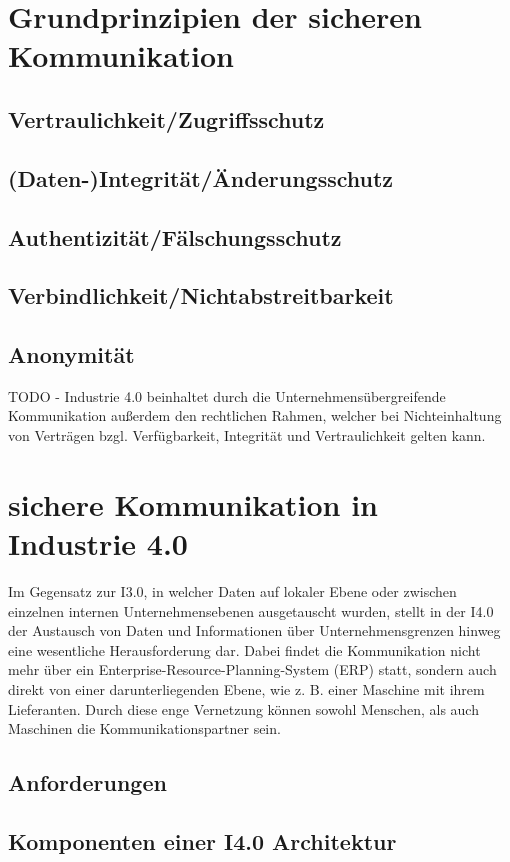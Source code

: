 \section{Grundprinzipien der sicheren Kommunikation}
\subsection{Vertraulichkeit/Zugriffsschutz}
\subsection{(Daten-)Integrität/Änderungsschutz}
\subsection{Authentizität/Fälschungsschutz}
\subsection{Verbindlichkeit/Nichtabstreitbarkeit}
\subsection{Anonymität}

TODO - Industrie 4.0 beinhaltet durch die Unternehmensübergreifende Kommunikation außerdem den rechtlichen Rahmen, welcher bei Nichteinhaltung von Verträgen bzgl. Verfügbarkeit, Integrität und Vertraulichkeit gelten kann.

\section{sichere Kommunikation in Industrie 4.0}
Im Gegensatz zur I3.0, in welcher Daten auf lokaler Ebene oder zwischen einzelnen internen Unternehmensebenen ausgetauscht wurden, stellt in der I4.0 der Austausch von Daten und Informationen über Unternehmensgrenzen hinweg eine wesentliche Herausforderung dar. Dabei findet die Kommunikation nicht mehr über ein Enterprise-Resource-Planning-System (ERP) statt, sondern auch direkt von einer darunterliegenden Ebene, wie z. B. einer Maschine mit ihrem Lieferanten. Durch diese enge Vernetzung können sowohl Menschen, als auch Maschinen die Kommunikationspartner sein.

\subsection{Anforderungen}
\subsection{Komponenten einer I4.0 Architektur}
